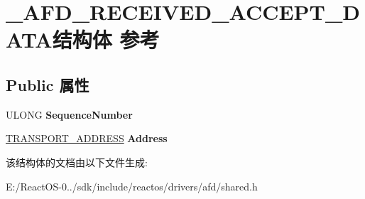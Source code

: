 \hypertarget{struct___a_f_d___r_e_c_e_i_v_e_d___a_c_c_e_p_t___d_a_t_a}{}\section{\+\_\+\+A\+F\+D\+\_\+\+R\+E\+C\+E\+I\+V\+E\+D\+\_\+\+A\+C\+C\+E\+P\+T\+\_\+\+D\+A\+T\+A结构体 参考}
\label{struct___a_f_d___r_e_c_e_i_v_e_d___a_c_c_e_p_t___d_a_t_a}
\subsection*{Public 属性}
\begin{DoxyCompactItemize}
\item 
\mbox{\label{struct___a_f_d___r_e_c_e_i_v_e_d___a_c_c_e_p_t___d_a_t_a_a6d430ace61c99527815e19ddc557bb86}} 
U\+L\+O\+NG {\bfseries Sequence\+Number}
\item 
\mbox{\label{struct___a_f_d___r_e_c_e_i_v_e_d___a_c_c_e_p_t___d_a_t_a_a34d96c44994e59f85b992fb67cccdbf2}} 
\hyperlink{struct___t_r_a_n_s_p_o_r_t___a_d_d_r_e_s_s}{T\+R\+A\+N\+S\+P\+O\+R\+T\+\_\+\+A\+D\+D\+R\+E\+SS} {\bfseries Address}
\end{DoxyCompactItemize}


该结构体的文档由以下文件生成\+:\begin{DoxyCompactItemize}
\item 
E\+:/\+React\+O\+S-\/0../sdk/include/reactos/drivers/afd/shared.\+h\end{DoxyCompactItemize}

